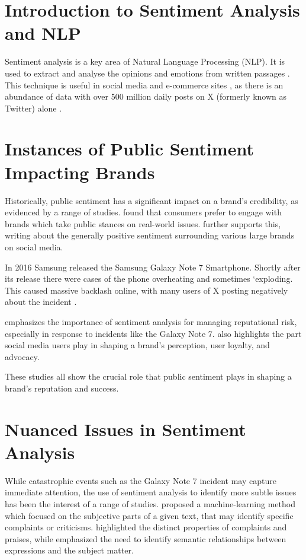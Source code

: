 \section{Introduction to Sentiment Analysis and NLP}
Sentiment analysis is a key area of Natural Language Processing (NLP). It is used to extract and analyse the opinions and emotions from written passages \citep{dhuria2015sentiment, mishra2022data}. This technique is useful in social media and e-commerce sites \citep{anny2022sentiment}, as there is an abundance of data with over 500 million daily posts on X (formerly known as Twitter) alone \citep{sayce2022twitter}.

\section{Instances of Public Sentiment Impacting Brands}
Historically, public sentiment has a significant impact on a brand's credibility, as evidenced by a range of studies. \citet{berestova2022consumers} found that consumers prefer to engage with brands which take public stances on real-world issues. \citet{mostafa2013more} further supports this, writing about the generally positive sentiment surrounding various large brands on social media.

In 2016 Samsung released the Samsung Galaxy Note 7 Smartphone. Shortly after its release there were cases of the phone overheating and sometimes `exploding. This caused massive backlash online, with many users of X posting negatively about the incident \citep{kang2019social}.

\citet{lange2011people} emphasizes the importance of sentiment analysis for managing reputational risk, especially in response to incidents like the Galaxy Note 7. \citet{hu2017analyzing} also highlights the part social media users play in shaping a brand's perception, user loyalty, and advocacy.

These studies all show the crucial role that public sentiment plays in shaping a brand's reputation and success.

\section{Nuanced Issues in Sentiment Analysis}
While catastrophic events such as the Galaxy Note 7 incident may capture immediate attention, the use of sentiment analysis to identify more subtle issues has been the interest of a range of studies. \citet{pang2004sentimental} proposed a machine-learning method which focused on the subjective parts of a given text, that may identify specific complaints or criticisms. \citet{zhou2016linguistic} highlighted the distinct properties of complaints and praises, while \citet{nasukawa2003sentiment} emphasized the need to identify semantic relationships between expressions and the subject matter.

